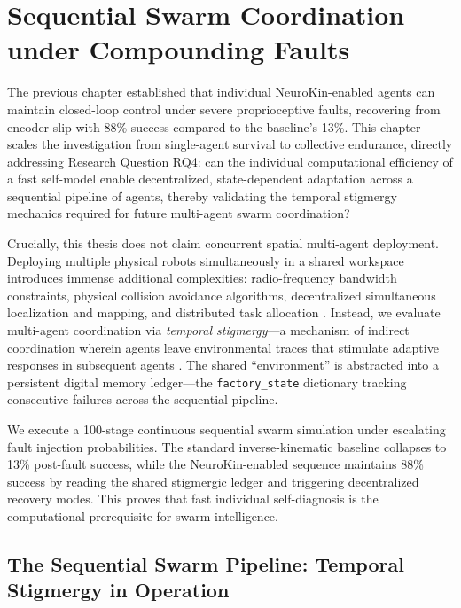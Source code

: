 \documentclass[12pt,a4paper,oneside]{report}
\begin{document}
\chapter{Sequential Swarm Coordination under Compounding Faults}
\label{chap:sequential_swarm_coordination}

The previous chapter established that individual NeuroKin-enabled agents can maintain closed-loop control under severe proprioceptive faults, recovering from encoder slip with 88\% success compared to the baseline's 13\%. This chapter scales the investigation from single-agent survival to collective endurance, directly addressing Research Question RQ4: can the individual computational efficiency of a fast self-model enable decentralized, state-dependent adaptation across a sequential pipeline of agents, thereby validating the temporal stigmergy mechanics required for future multi-agent swarm coordination?

Crucially, this thesis does not claim concurrent spatial multi-agent deployment. Deploying multiple physical robots simultaneously in a shared workspace introduces immense additional complexities: radio-frequency bandwidth constraints, physical collision avoidance algorithms, decentralized simultaneous localization and mapping, and distributed task allocation \cite{matsuki2024gaussian, keetha2024splattam}. Instead, we evaluate multi-agent coordination via \textit{temporal stigmergy}—a mechanism of indirect coordination wherein agents leave environmental traces that stimulate adaptive responses in subsequent agents \cite{bongard2006resilient}. The shared ``environment'' is abstracted into a persistent digital memory ledger—the \texttt{factory\_state} dictionary tracking consecutive failures across the sequential pipeline.

We execute a 100-stage continuous sequential swarm simulation under escalating fault injection probabilities. The standard inverse-kinematic baseline collapses to 13\% post-fault success, while the NeuroKin-enabled sequence maintains 88\% success by reading the shared stigmergic ledger and triggering decentralized recovery modes. This proves that fast individual self-diagnosis is the computational prerequisite for swarm intelligence.

\section{The Sequential Swarm Pipeline: Temporal Stigmergy in Operation}
\end{document}
